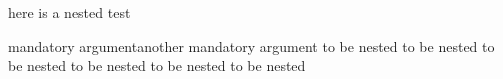 here is a nested test
\begin{one}{mandatory argument}{another mandatory argument}
	to be nested to be nested
	to be nested to be nested
	to be nested to be nested
\end{one}

